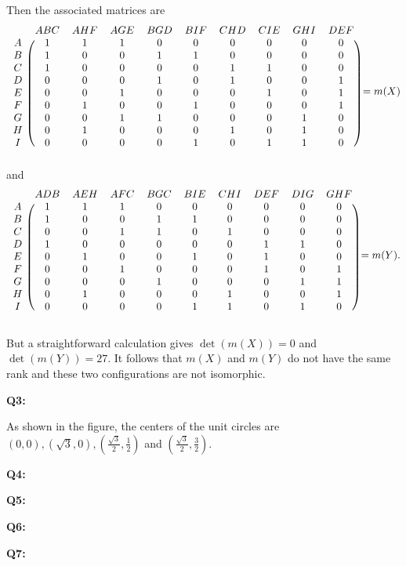 \documentclass[12pt,reqno]{amsart}
\theoremstyle{definition}
\begin{document}
Then the associated matrices are
\[
  \begin{blockarray}{cccccccccc}
    & ABC & AHF & AGE & BGD & BIF & CHD & CIE & GHI & DEF \\
    \begin{block}{c(ccccccccc)}
      A & 1 & 1 & 1 & 0 & 0 & 0&0&0&0 \\
      B & 1 & 0 & 0 & 1 & 1&0&0&0&0 \\
      C & 1&0&0&0&0&1&1&0&0\\
      D &0&0&0&1&0&1&0&0&1\\
      E &0&0&1&0&0&0&1&0&1\\
      F &0&1&0&0&1&0&0&0&1\\
      G &0&0&1&1&0&0&0&1&0\\
      H &0&1&0&0&0&1&0&1&0\\
      I &0&0&0&0&1&0&1&1&0\\
    \end{block}
  \end{blockarray} = m(X)
\]
and
\[
  \begin{blockarray}{cccccccccc}
    & ADB & AEH &AFC& BGC&BIE&CHI&DEF&DIG&GHF\\
    \begin{block}{c(ccccccccc)}
      A & 1 & 1 & 1 & 0 & 0 & 0&0&0&0 \\
      B & 1 & 0 & 0 & 1 & 1&0&0&0&0 \\
      C &0&0&1&1&0&1&0&0&0\\
      D &1&0&0&0&0&0&1&1&0\\
      E &0&1&0&0&1&0&1&0&0\\
      F &0&0&1&0&0&0&1&0&1\\
      G &0&0&0&1&0&0&0&1&1\\
      H &0&1&0&0&0&1&0&0&1\\
      I &0&0&0&0&1&1&0&1&0\\
    \end{block}
  \end{blockarray} = m(Y).
\]

But a straightforward calculation gives $\det(m(X)) = 0$ and $\det(m(Y))=27$. It follows that $m(X)$ and $m(Y)$ do not have the same rank and these two configurations are not isomorphic.


\newpage
\noindent \textbf{Q3:}

\begin{center}
\end{center}

As shown in the figure, the centers of the unit circles are $(0,0),(\sqrt{3},0),(\frac{\sqrt{3}}{2},\frac{1}{2})$ and $(\frac{\sqrt{3}}{2},\frac{3}{2})$.


\newpage
\noindent \textbf{Q4:}


\newpage
\noindent \textbf{Q5:}


\newpage
\noindent \textbf{Q6:}



\newpage
\noindent \textbf{Q7:}
\end{document}
